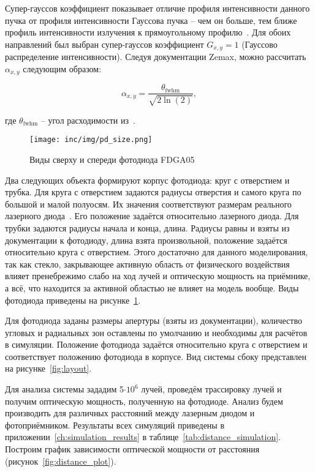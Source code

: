 Супер-гауссов коэффициент показывает отличие профиля интенсивности данного пучка от профиля интенсивности Гауссова пучка \--- чем он больше, тем ближе профиль интенсивности излучения к прямоугольному профилю~\cite{Paschotta2008}. Для обоих направлений был выбран супер-гауссов коэффициент $G_{x,y} = 1$ (Гауссово распределение интенсивности). Следуя документации Zemax, можно рассчитать $\alpha_{x,y}$ следующим образом: 

\begin{equation*}
    \alpha_{x, y}=\frac{\theta_{\mathrm{fwhm}}}{\sqrt{2 \ln (2)}},
\end{equation*}

где $\theta_{\mathrm{fwhm}}$ \--- угол расходимости из~\cite{LDThorlabs}.

\begin{figure}[!h]
    \centering
    \texttt{[image: inc/img/pd\_size.png]}
    \caption{Виды сверху и спереди фотодиода FDGA05~\cite{PDThorlabs}}
    \label{fig:pdviews}
\end{figure}

Два следующих объекта формируют корпус фотодиода: круг с отверстием и трубка. Для круга с отверстием задаются радиусы отверстия и самого круга по большой и малой полуосям. Их значения соответствуют размерам реального лазерного диода~\cite{PDThorlabs}. Его положение задаётся относительно лазерного диода. Для трубки задаются радиусы начала и конца, длина. Радиусы равны и взяты из документации к фотодиоду, длина взята произвольной, положение задаётся относительно круга с отверстием. Этого достаточно для данного моделирования, так как стекло, закрывающее активную область от физического воздействия влияет пренебрежимо слабо на ход лучей и оптическую мощность на приёмнике, а всё, что находится за активной областью не влияет на модель вообще. Виды фотодиода приведены на рисунке~\ref{fig:pdviews}.

Для фотодиода заданы размеры апертуры (взяты из документации), количество угловых и радиальных зон оставлены по умолчанию и необходимы для расчётов в симуляции. Положение фотодиода задаётся относительно круга с отверстием и соответствует положению фотодиода в корпусе. Вид системы сбоку представлен на рисунке~\ref{fig:layout}.

Для анализа системы зададим 5$\cdot \text{10}^6$ лучей, проведём трассировку лучей и получим оптическую мощность, полученную на фотодиоде. Анализ будем производить для различных расстояний между лазерным диодом и фотоприёмником. Результаты всех симуляций приведены в приложении~\ref{ch:simulation_results} в таблице~\ref{tab:distance_simulation}. Построим график зависимости оптической мощности от расстояния (рисунок~\ref{fig:distance_plot}).

